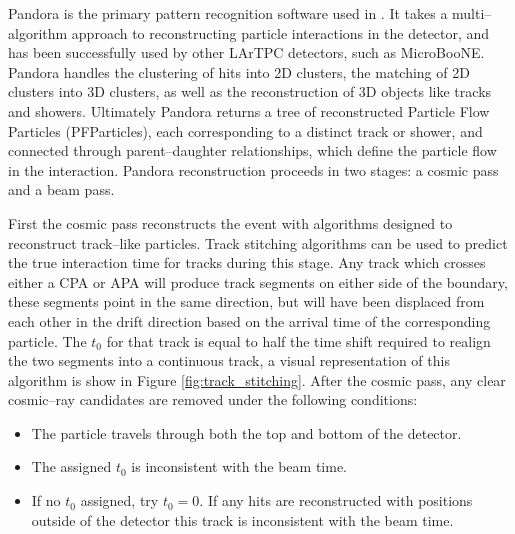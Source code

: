 Pandora\cite{Marshall2015} is the primary pattern recognition software used in
\protodune{}. It takes a multi--algorithm approach to reconstructing particle
interactions in the detector, and has been successfully used by other LArTPC
detectors, such as MicroBooNE\cite{Acciarri:2017hat}. Pandora handles the 
clustering of hits into 2D clusters, the matching of 2D clusters into 3D
clusters, as well as the reconstruction of 3D objects like tracks and 
showers. Ultimately Pandora returns a tree of reconstructed Particle Flow
Particles (PFParticles), each corresponding to a distinct track or shower, and 
connected through parent--daughter relationships, which define the particle flow
in the interaction. Pandora reconstruction proceeds in two stages: a cosmic 
pass and a beam pass. 


First the cosmic pass reconstructs the event with algorithms designed to 
reconstruct track--like particles. Track stitching algorithms can be used to
predict the true interaction time for tracks during this stage. Any track which 
crosses either a CPA or APA will produce track segments on either side of the 
boundary, these segments point in the same direction, but will have been 
displaced from each other in the drift direction based on the arrival time of 
the corresponding particle. The $t_0$ for that track is equal to half the time 
shift required to realign the two segments into a continuous track, a visual
representation of this algorithm is show in Figure \ref{fig:track_stitching}. 
After the cosmic pass, any clear cosmic--ray candidates are removed under the 
following conditions\cite{protoduneperf}:
\begin{itemize}
	\item The particle travels through both the top and bottom of the detector.
	\item The assigned $t_0$ is inconsistent with the beam time.
	\item If no $t_0$ assigned, try $t_0 = 0$. If any hits are reconstructed 
		with positions outside of the detector this track is inconsistent with the 
		beam time.
\end{itemize}

